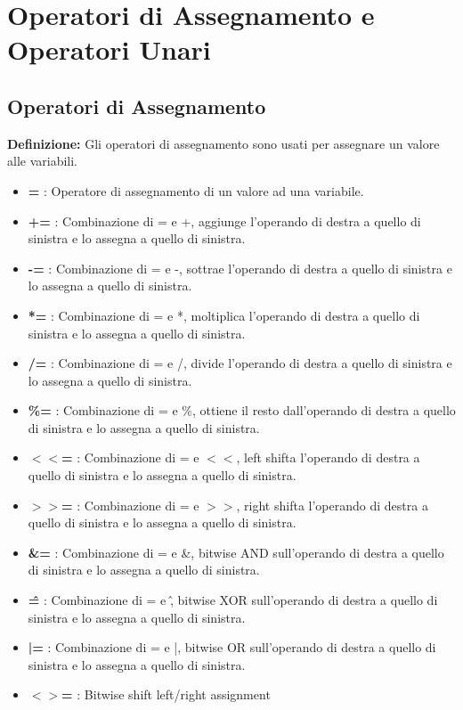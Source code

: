 
\section{Operatori di Assegnamento e Operatori Unari}

\subsection{Operatori di Assegnamento}

\textsf{\small \textbf{Definizione: } Gli operatori di assegnamento sono usati per assegnare un valore alle variabili.} \\

\begin{itemize}
	\item \textsf{\small \textbf{=} : Operatore di assegnamento di un valore ad una variabile.}
	\item \textsf{\small \textbf{+=} : Combinazione di = e +, aggiunge l'operando di destra a quello di sinistra e lo assegna a quello di sinistra.}
	\item \textsf{\small \textbf{-=} : Combinazione di = e -, sottrae l'operando di destra a quello di sinistra e lo assegna a quello di sinistra.}
	\item \textsf{\small \textbf{*=} : Combinazione di = e *, moltiplica l'operando di destra a quello di sinistra e lo assegna a quello di sinistra.}
	\item \textsf{\small \textbf{/=} : Combinazione di = e /, divide l'operando di destra a quello di sinistra e lo assegna a quello di sinistra.}
	\item \textsf{\small \textbf{\%=} : Combinazione di = e \%, ottiene il resto dall'operando di destra a quello di sinistra e lo assegna a quello di sinistra.}
	\item \textsf{\small \textbf{$<<$=} : Combinazione di = e $<<$, left shifta l'operando di destra a quello di sinistra e lo assegna a quello di sinistra.}
	\item \textsf{\small \textbf{$>>$=} : Combinazione di = e $>>$, right shifta l'operando di destra a quello di sinistra e lo assegna a quello di sinistra.}
	\item \textsf{\small \textbf{\&=} : Combinazione di = e \&, bitwise AND sull'operando di destra a quello di sinistra e lo assegna a quello di sinistra.}
	\item \textsf{\small \textbf{\^ =} : Combinazione di = e \^, bitwise XOR sull'operando di destra a quello di sinistra e lo assegna a quello di sinistra.}
	\item \textsf{\small \textbf{|=} : Combinazione di = e |, bitwise OR sull'operando di destra a quello di sinistra e lo assegna a quello di sinistra.}
	\item \textsf{\small \textbf{$<>$=} : Bitwise shift left/right assignment} 
\end{itemize}

